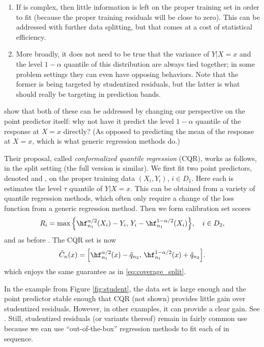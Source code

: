 \documentclass{article}
\begin{document}
\begin{enumerate}
\item If  is complex, then little information is left on the
  proper training set in order to fit  (because the
  proper training residuals will be close to zero). This can be addressed with
  further data splitting, but that comes at a cost of statistical efficiency. 

\item More broadly, it does not need to be true that the variance of $Y|X=x$ and
  the level $1-\alpha$ quantile of this distribution are always tied together;
  in some problem settings they can even have opposing behaviors. Note that the
  former is being targeted by studentized residuals, but the latter is what
  should really be targeting in prediction bands.       
\end{enumerate}

\citet{romano2019conformalized} show that both of these can be addressed by
changing our perspective on the point predictor itself: why not have it predict
the level $1-\alpha$ quantile of the response at $X=x$ directly? (As opposed to
predicting the mean of the response at $X=x$, which is what generic regression
methods do.) 

Their proposal, called \emph{conformalized quantile regression} (CQR), works as
follows, in the split setting (the full version is similar). We first fit two
point predictors, denoted  and
, on the proper training data $(X_i,Y_i)$, $i  
\in D_1$. Here each  is estimates the level $\tau$
quantile of $Y|X=x$. This can be obtained from a variety of quantile regression  
methods, which often only require a change of the loss function from a generic
regression method. Then we form calibration set scores    
\[
R_i = \max\Big\{\hf^{\alpha/2}_{n_1}(X_i) - Y_i, \, 
Y_i - \hf^{1-\alpha/2}_{n_1}(X_i) \Big\}, \quad i \in D_2, 
\]
and as before . The CQR set is now  
\begin{equation}
\label{eq:cset_cqr_split}
\hC_n(x) = \Big[ \hf^{\alpha/2}_{n_1}(x) - \hq_{n_2}, \,
\hf^{1-\alpha/2}_{n_1}(x) + \hq_{n_2} \Big].
\end{equation}
which enjoys the same guarantee as in \eqref{eq:coverage_split}. 

In the example from Figure \ref{fig:student}, the data set is large enough and
the point predictor stable enough that CQR (not shown) provides little gain over
studentized residuals. However, in other examples, it can provide a clear  
gain. See \citet{romano2019conformalized}. Still, studentized residuals (or
variants thereof) remain in fairly common use because we can use
``out-of-the-box'' regression methods to fit each of  in sequence.
\end{document}
